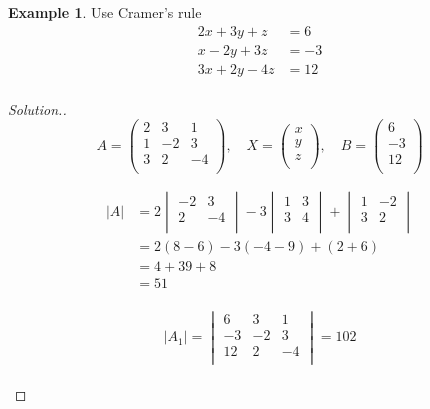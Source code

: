 \documentclass[11pt,a4paper]{article}
\theoremstyle{definition}
\newtheorem{example}[thm]{Example}
\newenvironment{solution}
  {\renewcommand{\qedsymbol}{}\begin{proof}[\textit{Solution}.]}
  {\end{proof}}
\begin{document}
\begin{example}

Use Cramer's rule
\begin{align*}
2x+3y+z & =6\\
x-2y+3z &=-3\\
3x+2y-4z & =12\\
\end{align*}
\end{example}
\begin{solution}

$$A=
\begin{pmatrix}
2 & 3 & 1\\
1 & -2 & 3\\
3 & 2 & -4\\
\end{pmatrix}
,\quad  X=
\begin{pmatrix}
x\\y\\z\\
\end{pmatrix}
,\quad  
B=
\begin{pmatrix}
6\\-3\\12\\
\end{pmatrix}
$$

\begin{align*}
|A| &=2
\begin{vmatrix}
-2 & 3\\
2 & -4\\
\end{vmatrix}
-3
\begin{vmatrix}
1 & 3\\
3 & 4\\
\end{vmatrix}
+
\begin{vmatrix}
1 & -2\\
3 & 2\\
\end{vmatrix}\\
& = 2(8-6)-3(-4-9)+(2+6)\\
& = 4 + 39 +8\\
& = 51\\
\end{align*}

$$|A_1|=
\begin{vmatrix}
6 & 3 & 1\\
-3 & -2 & 3\\
12 & 2 & -4\\
\end{vmatrix}
=102$$\\


\end{solution}
\end{document}
